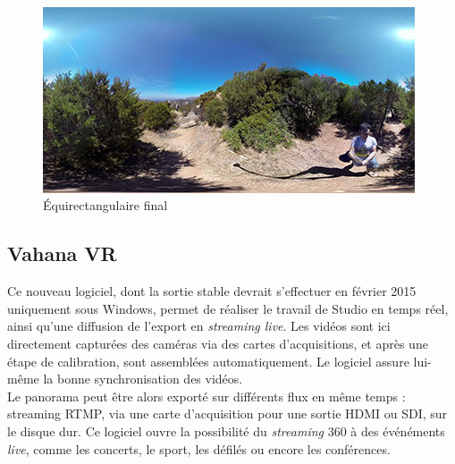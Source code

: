 \begin{figure}
  \centering
  \includegraphics[width=11cm]{images/studio-equirectangular.jpg}
  \caption{Équirectangulaire final} 
\end{figure}

\subsection{Vahana VR}
\label{vahana-vr-section}
Ce nouveau logiciel, dont la sortie stable devrait s'effectuer en février 2015 uniquement sous Windows,
permet de réaliser le travail de Studio en temps réel, ainsi qu'une diffusion
de l'export en \textit{streaming live}. Les vidéos sont ici directement capturées des
caméras via des cartes d'acquisitions, et après une étape de calibration, sont
assemblées automatiquement. Le logiciel assure lui-même la bonne synchronisation
des vidéos.\\
Le panorama peut être alors exporté sur différents flux en même temps : 
streaming RTMP, via une carte d'acquisition pour une sortie HDMI ou SDI, sur le
disque dur. Ce logiciel ouvre la possibilité du \textit{streaming} 360 à des événéments 
\textit{live}, comme les concerts, le sport, les défilés ou encore les conférences.
